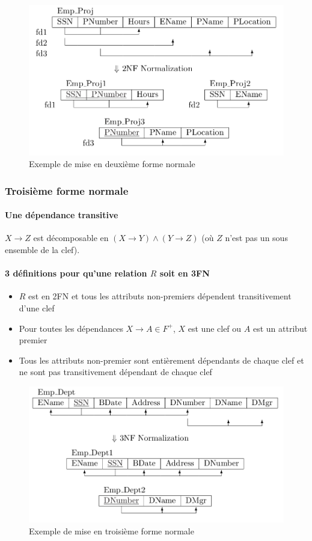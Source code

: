\documentclass[a4paper]{article}
\begin{document}
\begin{figure}[H]
\center
\includegraphics[width=.6\textwidth]{fig/2fn-ex.png}
\caption{Exemple de mise en deuxième forme normale}
\end{figure}

\subsubsection{Troisième forme normale}
\paragraph{Une dépendance transitive} $X \rightarrow Z$ est décomposable en
$(X \rightarrow Y) \land (Y \rightarrow Z)$ (où $Z$ n'est pas un sous ensemble de la clef).
\paragraph{3 définitions pour qu'une relation $R$ soit en 3FN}
\begin{itemize}
  \item $R$ est en 2FN et tous les attributs non-premiers dépendent transitivement d'une clef
  \item Pour toutes les dépendances $X \rightarrow A \in F^+$, $X$ est une clef ou $A$ est un attribut premier
  \item Tous les attributs non-premier sont entièrement dépendants de chaque clef
        et ne sont pas transitivement dépendant de chaque clef
\end{itemize}

\begin{figure}[H]
\center
\includegraphics[width=.6\textwidth]{fig/3fn-ex.png}
\caption{Exemple de mise en troisième forme normale}
\end{figure}
\end{document}

